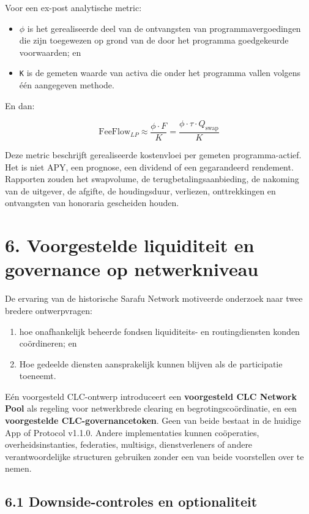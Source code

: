 \documentclass[11pt]{article}
\begin{document}
Voor een ex-post analytische metric:

\begin{itemize}[leftmargin=*]
\item \texttt{$\phi$} is het gerealiseerde deel van de ontvangsten van programmavergoedingen die zijn toegewezen op grond van de door het programma goedgekeurde voorwaarden; en
\item \texttt{K} is de gemeten waarde van activa die onder het programma vallen volgens één aangegeven methode.
\end{itemize}
En dan:

\[
\mathrm{FeeFlow}_{LP} \approx \frac{\phi \cdot F}{K} = \frac{\phi \cdot \tau \cdot Q_{\mathrm{swap}}}{K}
\]

Deze metric beschrijft gerealiseerde kostenvloei per gemeten programma-actief. Het is niet APY, een prognose, een dividend of een gegarandeerd rendement. Rapporten zouden het swapvolume, de terugbetalingsaanbieding, de nakoming van de uitgever, de afgifte, de houdingsduur, verliezen, onttrekkingen en ontvangsten van honoraria gescheiden houden.


\section*{6. Voorgestelde liquiditeit en governance op netwerkniveau}

De ervaring van de historische Sarafu Network motiveerde onderzoek naar twee bredere ontwerpvragen:

\begin{enumerate}[leftmargin=*]
\item hoe onafhankelijk beheerde fondsen liquiditeits- en routingdiensten konden coördineren; en
\item Hoe gedeelde diensten aansprakelijk kunnen blijven als de participatie toeneemt.
\end{enumerate}
Eén voorgesteld CLC-ontwerp introduceert een \textbf{voorgesteld CLC Network Pool} als regeling voor netwerkbrede clearing en begrotingscoördinatie, en een \textbf{voorgestelde CLC-governancetoken}. Geen van beide bestaat in de huidige App of Protocol v1.1.0. Andere implementaties kunnen coöperaties, overheidsinstanties, federaties, multisigs, dienstverleners of andere verantwoordelijke structuren gebruiken zonder een van beide voorstellen over te nemen.

\subsection*{6.1 Downside-controles en optionaliteit}
\end{document}
